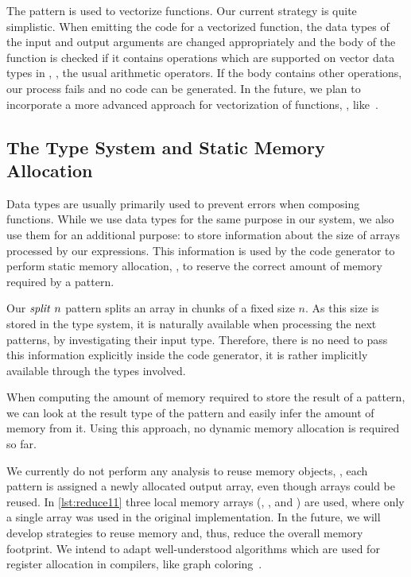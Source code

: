 The \vect pattern is used to vectorize functions.
Our current strategy is quite simplistic.
When emitting the \OpenCL code for a vectorized function, the data types of the input and output arguments are changed appropriately and the body of the function is checked if it contains operations which are supported on vector data types in \OpenCL, \eg, the usual arithmetic operators.
If the body contains other operations, our process fails and no \OpenCL code can be generated.
In the future, we plan to incorporate a more advanced approach for vectorization of functions, \eg, like~\cite{KarrenbergHa2011}.


\subsection{The Type System and Static Memory Allocation}
\label{section:typeSystem}
Data types are usually primarily used to prevent errors when composing functions.
While we use data types for the same purpose in our system, we also use them for an additional purpose: to store information about the size of arrays processed by our expressions.
This information is used by the code generator to perform static memory allocation, \ie, to reserve the correct amount of memory required by a pattern.

Our $\text{\textit{split}}\ n$ pattern splits an array in chunks of a fixed size $n$.
As this size is stored in the type system, it is naturally available when processing the next patterns, by investigating their input type.
Therefore, there is no need to pass this information explicitly inside the code generator, it is rather implicitly available through the types involved.

When computing the amount of memory required to store the result of a pattern, we can look at the result type of the pattern and easily infer the amount of memory from it.
Using this approach, no dynamic memory allocation is required so far.

We currently do not perform any analysis to reuse memory objects, \ie, each pattern is assigned a newly allocated output array, even though arrays could be reused.
In \autoref{lst:reduce11} three local memory arrays (, , and ) are used, where only a single array was used in the original \OpenCL implementation.
In the future, we will develop strategies to reuse memory and, thus, reduce the overall memory footprint.
We intend to adapt well-understood algorithms which are used for register allocation in compilers, like graph coloring~\cite{CooperTo2004}.

